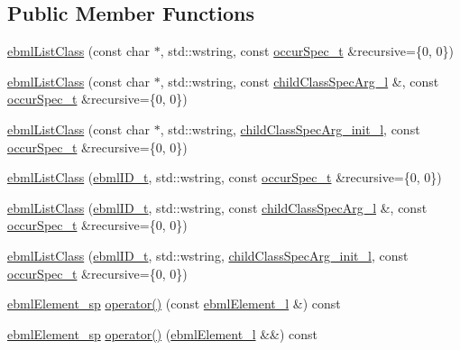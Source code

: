 \subsection*{Public Member Functions}
\begin{DoxyCompactItemize}
\item 
\mbox{\hyperlink{classebml_1_1ebmlListClass_a1ed01342e437e0f0623227332daca196}{ebml\+List\+Class}} (const char $\ast$, std\+::wstring, const \mbox{\hyperlink{structebml_1_1occurSpec__t}{occur\+Spec\+\_\+t}} \&recursive=\{0, 0\})
\item 
\mbox{\hyperlink{classebml_1_1ebmlListClass_a24e6fe828362bc733f21ee1d122325fc}{ebml\+List\+Class}} (const char $\ast$, std\+::wstring, const \mbox{\hyperlink{namespaceebml_abf07998998c284c9be3f76b5d9e192e1}{child\+Class\+Spec\+Arg\+\_\+l}} \&, const \mbox{\hyperlink{structebml_1_1occurSpec__t}{occur\+Spec\+\_\+t}} \&recursive=\{0, 0\})
\item 
\mbox{\hyperlink{classebml_1_1ebmlListClass_a65279c4d8e601600a55854a15e582388}{ebml\+List\+Class}} (const char $\ast$, std\+::wstring, \mbox{\hyperlink{namespaceebml_a40cf7ad4b58caaa8c07da3ed83f7a431}{child\+Class\+Spec\+Arg\+\_\+init\+\_\+l}}, const \mbox{\hyperlink{structebml_1_1occurSpec__t}{occur\+Spec\+\_\+t}} \&recursive=\{0, 0\})
\item 
\mbox{\hyperlink{classebml_1_1ebmlListClass_a18f17432c67895e3d89b04a65ed5733a}{ebml\+List\+Class}} (\mbox{\hyperlink{namespaceebml_a86c5f604ddf12a74aa9812e997a58691}{ebml\+I\+D\+\_\+t}}, std\+::wstring, const \mbox{\hyperlink{structebml_1_1occurSpec__t}{occur\+Spec\+\_\+t}} \&recursive=\{0, 0\})
\item 
\mbox{\hyperlink{classebml_1_1ebmlListClass_a373906bae3c82a6c05f848822abd8e36}{ebml\+List\+Class}} (\mbox{\hyperlink{namespaceebml_a86c5f604ddf12a74aa9812e997a58691}{ebml\+I\+D\+\_\+t}}, std\+::wstring, const \mbox{\hyperlink{namespaceebml_abf07998998c284c9be3f76b5d9e192e1}{child\+Class\+Spec\+Arg\+\_\+l}} \&, const \mbox{\hyperlink{structebml_1_1occurSpec__t}{occur\+Spec\+\_\+t}} \&recursive=\{0, 0\})
\item 
\mbox{\hyperlink{classebml_1_1ebmlListClass_a36f6bdc1d175392d0560058f450e1e94}{ebml\+List\+Class}} (\mbox{\hyperlink{namespaceebml_a86c5f604ddf12a74aa9812e997a58691}{ebml\+I\+D\+\_\+t}}, std\+::wstring, \mbox{\hyperlink{namespaceebml_a40cf7ad4b58caaa8c07da3ed83f7a431}{child\+Class\+Spec\+Arg\+\_\+init\+\_\+l}}, const \mbox{\hyperlink{structebml_1_1occurSpec__t}{occur\+Spec\+\_\+t}} \&recursive=\{0, 0\})
\item 
\mbox{\hyperlink{namespaceebml_adad533b7705a16bb360fe56380c5e7be}{ebml\+Element\+\_\+sp}} \mbox{\hyperlink{classebml_1_1ebmlListClass_a115d07c81b0433aaa0510134dabf0f66}{operator()}} (const \mbox{\hyperlink{namespaceebml_a1ddadd26791f273d851882653b9caf70}{ebml\+Element\+\_\+l}} \&) const
\item 
\mbox{\hyperlink{namespaceebml_adad533b7705a16bb360fe56380c5e7be}{ebml\+Element\+\_\+sp}} \mbox{\hyperlink{classebml_1_1ebmlListClass_a5a52d343c43baa7eeb837fb0ab660c07}{operator()}} (\mbox{\hyperlink{namespaceebml_a1ddadd26791f273d851882653b9caf70}{ebml\+Element\+\_\+l}} \&\&) const
\end{DoxyCompactItemize}
